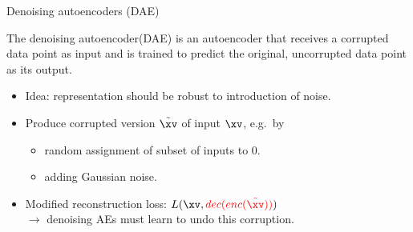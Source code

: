\begin{vbframe}{Denoising autoencoders (DAE)}

The denoising autoencoder(DAE) is an autoencoder that receives a corrupted data point as input and is trained to predict the original, uncorrupted data point as its output.

    \begin{itemize}
       \item Idea: representation should be robust to introduction of noise.
       \item Produce corrupted version $\tilde{\xv} $ of  input $\xv$, e.g.~by
     \begin{itemize}  
        \item random assignment of subset of inputs to 0.
      \item adding Gaussian noise.
       \end{itemize}
        \item Modified reconstruction loss: $L(\xv, \color{red}{dec(enc(\tilde{\xv}))}\color{black}{)}$ \\ %
           $\rightarrow$ denoising AEs must learn to undo this corruption.
    \end{itemize}
  
\framebreak


\end{vbframe}
